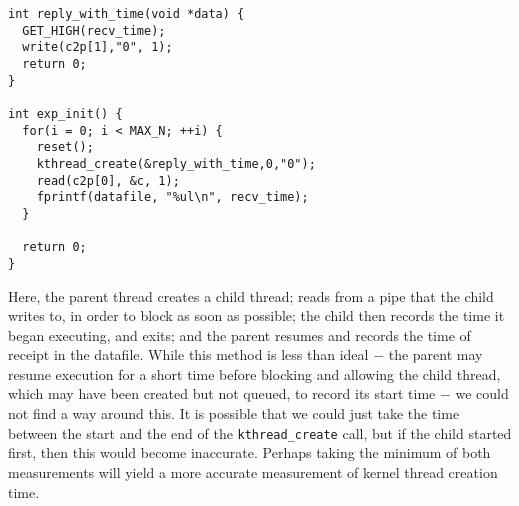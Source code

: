 \begin{verbatim}
int reply_with_time(void *data) {
  GET_HIGH(recv_time);
  write(c2p[1],"0", 1);
  return 0;
}

int exp_init() {
  for(i = 0; i < MAX_N; ++i) {
    reset();
    kthread_create(&reply_with_time,0,"0");
    read(c2p[0], &c, 1);
    fprintf(datafile, "%ul\n", recv_time);
  }

  return 0;
}
\end{verbatim}

\noindent Here, the parent thread creates a child thread; reads from a pipe that the child writes to, in order to block as soon as possible; the child then records the time it began executing, and exits; and the parent resumes and records the time of receipt in the datafile. 
\newline
\newline
While this method is less than ideal $-$ the parent may resume execution for a short time before blocking and allowing the child thread, which may have been created but not queued, to record its start time $-$ we could not find a way around this. It is possible that we could just take the time between the start and the end of the {\tt kthread\_create} call, but if the child started first, then this would become inaccurate. Perhaps taking the minimum of both measurements will yield a more accurate measurement of kernel thread creation time.